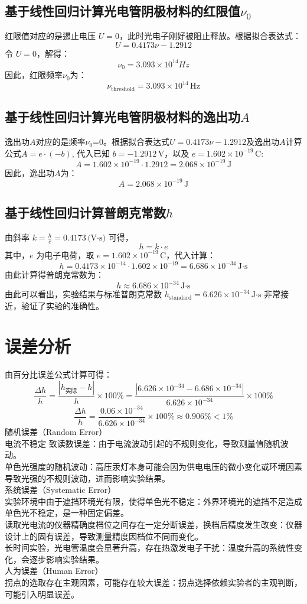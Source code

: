 \documentclass[12pt,a4paper]{article}
\begin{document}
	\subsection{基于线性回归计算光电管阴极材料的红限值$\nu_0$}
	红限值对应的是遏止电压 $U = 0$，此时光电子刚好被阻止释放。根据拟合表达式：
	\[
	U = 0.4173\nu - 1.2912
	\]
	令 $U = 0$，解得：
	\[
	\nu_0 = 3.093 \times 10^{14} Hz
	\]
	因此，红限频率$\nu_0$为：
	\[
	\nu_{\text{threshold}} = 3.093 \times 10^{14} \, \text{Hz}
	\]

	\subsection{基于线性回归计算光电管阴极材料的逸出功$A$}
	逸出功$A$对应的是频率$\nu_0$=0。根据拟合表达式$U = 0.4173\nu - 1.2912$及逸出功$A$计算公式$ A = e \cdot (-b)$,
	代入已知 $b = -1.2912 \, \text{V}$，以及 $e = 1.602 \times 10^{-19} \, \text{C}$:
	\[
	A = 1.602 \times 10^{-19} \cdot 1.2912
	  = 2.068 \times 10^{-19} \, \text{J}
	\]
	因此，逸出功$A$为：
	\[
		A = 2.068 \times 10^{-19} \, \text{J}
	\]

	\subsection{基于线性回归计算普朗克常数$h$}
	由斜率 $k = \frac{h}{e} = 0.4173 \, \text{(V·s)}$ 可得，
	$$h = k \cdot e$$
	其中，$e$ 为电子电荷，取 $e = 1.602 \times 10^{-19} \, \text{C}$，代入计算：
	\[
	h = 0.4173 \times 10^{-14} \cdot 1.602 \times 10^{-19}
	  = 6.686 \times 10^{-34} \, \text{J·s}
	\]
	由此计算得普朗克常数为：
	$$h \approx 6.686 \times 10^{-34} \, \text{J·s}$$
	由此可以看出，实验结果与标准普朗克常数 $h_{\text{standard}} = 6.626 \times 10^{-34} \, \text{J·s}$ 非常接近，验证了实验的准确性。

	\section{误差分析}
	由百分比误差公式计算可得：
	\[
	\frac{\Delta h}{h} = \frac{|h_{\text{实际}} - h|}{h} \times 100\% = \frac{|6.626 \times 10^{-34} - 6.686 \times 10^{-34}|}{6.626 \times 10^{-34}} \times 100\%
	\]
	\[
	\frac{\Delta h}{h} = \frac{0.06 \times 10^{-34}}{6.626 \times 10^{-34}} \times 100\% \approx 0.906\%<1\%
	\]
	随机误差（Random Error）\\
	电流不稳定 致读数误差：由于电流波动引起的不规则变化，导致测量值随机波动。\\
	单色光强度的随机波动：高压汞灯本身可能会因为供电电压的微小变化或环境因素导致光强的不规则波动，进而影响实验结果。\\
	系统误差（Systematic Error）\\
	实验环境中由于遮挡环境光有限，使得单色光不稳定：外界环境光的遮挡不足造成单色光不稳定，是一种固定偏差。\\
	读取光电流的仪器精确度档位之间存在一定分断误差，换档后精度发生改变：仪器设计上的固有误差，导致测量精度因档位不同而变化。\\
	长时间实验，光电管温度会显著升高，存在热激发电子干扰：温度升高的系统性变化，会逐步影响实验结果。\\
	人为误差（Human Error）\\
	拐点的选取存在主观因素，可能存在较大误差：拐点选择依赖实验者的主观判断，可能引入明显误差。
	
\end{document}

